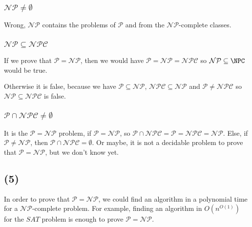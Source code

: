 \documentclass[a4paper,11pt]{report}
\newcommand*{\Pc}{\mathcal{P}}
\newcommand*{\NPc}{\mathcal{NP}}
\newcommand*{\NPCc}{\mathcal{NPC}}
\begin{document}
\subsubsection*{$\mathcal{NP} \not= \emptyset$}

Wrong, $\mathcal{NP}$ contains the problems of $\mathcal{P}$ and from the
$\mathcal{NP}$-complete classes.

\subsubsection*{$\mathcal{NP} \subseteq \mathcal{NPC}$}

If we prove that $\Pc = \NPc$, then we would have $\Pc = \NPc = \NPCc$ so $\NPc
\subseteq \NPC$ would be true.

Otherwise it is false, because we have $\Pc \subseteq \NPc$, $\NPCc \subseteq
\NPc$ and $\Pc \not= \NPCc$ so $\NPc \subseteq \NPCc$ is false.

\subsubsection*{$\mathcal{P} \cap \mathcal{NPC} \not= \emptyset$}

It is the $\Pc = \NPc$ problem, if $\Pc = \NPc$, so $\Pc \cap \NPCc = \Pc =
\NPCc = \NPc$. Else, if $\Pc \not= \NPc$, then $\Pc \cap \NPCc = \emptyset$. Or
maybe, it is not a decidable problem to prove that $\Pc = \NPc$, but we don't
know yet. 

\subsection*{(5)}

In order to prove that $\mathcal{P} = \mathcal{NP}$, we could find an algorithm
in a polynomial time for a $\mathcal{NP}$-complete problem. For example, finding
an algorithm in $O(n^{O(1)})$ for the $SAT$ problem is enough to prove
$\mathcal{P} = \mathcal{NP}$.
\end{document}

